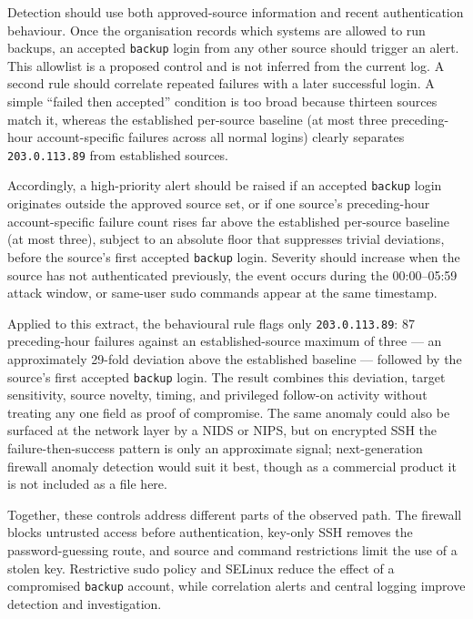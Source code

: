 Detection should use both approved-source information and recent authentication behaviour. Once the organisation records which systems are allowed to run backups, an accepted \texttt{backup} login from any other source should trigger an alert. This allowlist is a proposed control and is not inferred from the current log. A second rule should correlate repeated failures with a later successful login. A simple ``failed then accepted'' condition is too broad because thirteen sources match it, whereas the established per-source baseline (at most three preceding-hour account-specific failures across all normal logins) clearly separates \texttt{203.0.113.89} from established sources.

Accordingly, a high-priority alert should be raised if an accepted \texttt{backup} login originates outside the approved source set, or if one source's preceding-hour account-specific failure count rises far above the established per-source baseline (at most three), subject to an absolute floor that suppresses trivial deviations, before the source's first accepted \texttt{backup} login. Severity should increase when the source has not authenticated previously, the event occurs during the 00:00--05:59 attack window, or same-user sudo commands appear at the same timestamp.

Applied to this extract, the behavioural rule flags only \texttt{203.0.113.89}: 87 preceding-hour failures against an established-source maximum of three — an approximately 29-fold deviation above the established baseline — followed by the source's first accepted \texttt{backup} login. The result combines this deviation, target sensitivity, source novelty, timing, and privileged follow-on activity without treating any one field as proof of compromise. The same anomaly could also be surfaced at the network layer by a NIDS or NIPS, but on encrypted SSH the failure-then-success pattern is only an approximate signal; next-generation firewall anomaly detection would suit it best, though as a commercial product it is not included as a file here.

Together, these controls address different parts of the observed path. The firewall blocks untrusted access before authentication, key-only SSH removes the password-guessing route, and source and command restrictions limit the use of a stolen key. Restrictive sudo policy and SELinux reduce the effect of a compromised \texttt{backup} account, while correlation alerts and central logging improve detection and investigation.

